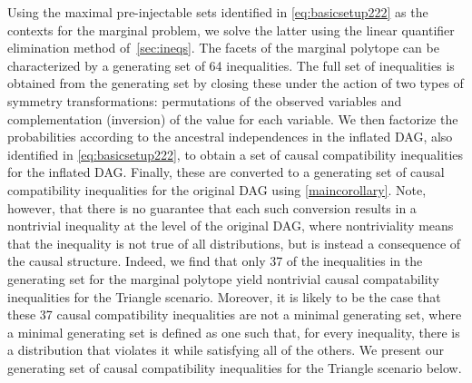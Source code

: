 Using the maximal pre-injectable sets identified in \cref{eq:basicsetup222} as the contexts for the marginal problem, we solve the latter using the linear quantifier elimination method of~\cref{sec:ineqs}.  The facets of the marginal polytope can be characterized by a generating set of 64 inequalities.  The full set of inequalities is obtained from the generating set by closing these under the action of two types of symmetry transformations: permutations of the observed variables and complementation (inversion) of the value for each variable. 
We then factorize the probabilities according to the ancestral independences in the inflated DAG, also identified in \cref{eq:basicsetup222}, to obtain a set of causal compatibility inequalities for the inflated DAG.  Finally, these are converted to a generating set of causal compatibility inequalities for the original DAG using \cref{maincorollary}.  Note, however, that there is no guarantee that each such conversion results in a nontrivial inequality at the level of the original DAG, where nontriviality means that the inequality is not true of all distributions, but is instead a consequence of the causal structure. Indeed, we find that only 37 of the inequalities in the generating set for the marginal polytope yield nontrivial causal compatability inequalities for the Triangle scenario. 
Moreover, it is likely to be the case that these 37 causal compatibility inequalities are not a minimal generating set, where a minimal generating set is defined as one such that, for every inequality, there is a distribution that violates it while satisfying all of the others. 
We present our generating set of causal compatibility inequalities for the Triangle scenario below.
